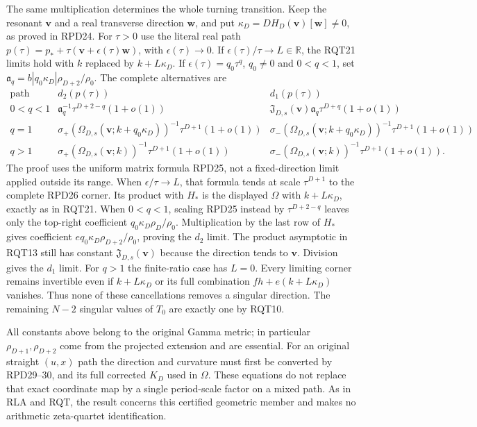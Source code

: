 \documentclass[11pt]{article}
\begin{document}
The same multiplication determines the whole turning transition.
Keep the resonant $\mathbf v$ and a real transverse direction
$\mathbf w$, and put $\kappa_D=DH_D(\mathbf v)[\mathbf w]\ne0$,
as proved in RPD24.  For $\tau>0$ use the literal real path
$p(\tau)=p_*+\tau(\mathbf v+\epsilon(\tau)\mathbf w)$,
with $\epsilon(\tau)\to0$.
If $\epsilon(\tau)/\tau\to L\in\mathbb R$, the RQT21 limits
hold with $k$ replaced by $k+L\kappa_D$.
If $\epsilon(\tau)=q_0\tau^q$, $q_0\ne0$ and $0<q<1$, set
$\mathfrak a_q=b|q_0\kappa_D|\rho_{D+2}/\rho_0$.
The complete alternatives are
\[
 \begin{array}{c|c|c}
 \text{path}& d_2(p(\tau))&d_1(p(\tau))\\\hline
 0<q<1&
 \mathfrak a_q^{-1}\tau^{D+2-q}(1+o(1))&
 \mathfrak J_{D,s}(\mathbf v)\mathfrak a_q
                  \tau^{D+q}(1+o(1))\\[2pt]
 q=1&
 \sigma_+(\Omega_{D,s}(\mathbf v;k+q_0\kappa_D))^{-1}
                  \tau^{D+1}(1+o(1))&
 \sigma_-(\Omega_{D,s}(\mathbf v;k+q_0\kappa_D))^{-1}
                  \tau^{D+1}(1+o(1))\\[2pt]
 q>1&
 \sigma_+(\Omega_{D,s}(\mathbf v;k))^{-1}
                  \tau^{D+1}(1+o(1))&
 \sigma_-(\Omega_{D,s}(\mathbf v;k))^{-1}
                  \tau^{D+1}(1+o(1)).
 \end{array}\tag{RQT22}
\]
The proof uses the uniform matrix formula RPD25, not a
fixed-direction limit applied outside its range.  When
$\epsilon/\tau\to L$, that formula tends at scale $\tau^{D+1}$
to the complete RPD26 corner.  Its product with $H_*$ is the
displayed $\Omega$ with $k+L\kappa_D$, exactly as in RQT21.
When $0<q<1$, scaling RPD25 instead by $\tau^{D+2-q}$ leaves only
the top-right coefficient $q_0\kappa_D\rho_D/\rho_0$.
Multiplication by the last row of $H_*$ gives coefficient
$eq_0\kappa_D\rho_{D+2}/\rho_0$, proving the $d_2$ limit.
The product asymptotic in RQT13 still has constant
$\mathfrak J_{D,s}(\mathbf v)$ because the direction tends to
$\mathbf v$.  Division gives the $d_1$ limit.
For $q>1$ the finite-ratio case has $L=0$.
Every limiting corner remains invertible even if
$k+L\kappa_D$ or its full combination $fh+e(k+L\kappa_D)$
vanishes.  Thus none of these cancellations removes a singular
direction.  The remaining $N-2$ singular values of $T_0$ are
exactly one by RQT10.

All constants above belong to the original Gamma metric; in
particular $\rho_{D+1},\rho_{D+2}$ come from the projected extension
and are essential.  For an original straight $(u,x)$ path the
direction and curvature must first be converted by RPD29--30,
and its full corrected $K_D$ used in $\Omega$.  These equations
do not replace that exact coordinate map by a single period-scale
factor on a mixed path.  As in RLA and RQT, the result concerns
this certified geometric member and makes no arithmetic
zeta-quartet identification.
\end{document}
